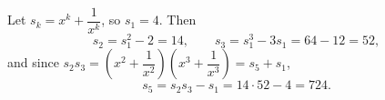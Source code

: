 Let $s_k=x^k+\dfrac{1}{x^k}$, so $s_1=4$. Then
\[
s_2=s_1^2-2=14,\qquad s_3=s_1^3-3s_1=64-12=52,
\]
and since $s_2s_3=\left(x^2+\dfrac{1}{x^2}\right)\left(x^3+\dfrac{1}{x^3}\right)=s_5+s_1$,
\[
s_5=s_2s_3-s_1=14\cdot52-4=\boxed{724}.
\]
